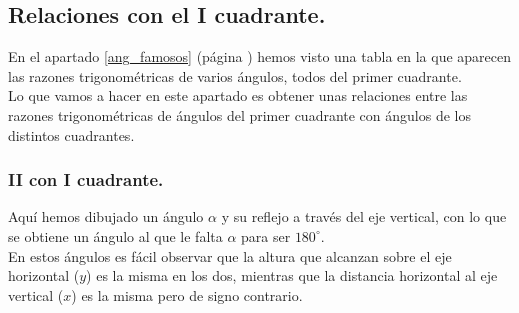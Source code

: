 \documentclass[a4paper,11pt,answers]{exam}
\newcommand{\degree}{^\circ}
\begin{document}
\subsection{Relaciones con el I cuadrante.}
En el apartado \ref{ang_famosos} (página \pageref{ang_famosos}) hemos visto una tabla en la que aparecen las razones trigonométricas de varios ángulos, todos del primer cuadrante.\\
Lo que vamos a hacer en este apartado es obtener unas relaciones entre las razones trigonométricas de ángulos del primer cuadrante con ángulos de los distintos cuadrantes.\\
\subsubsection{II con I cuadrante.} \label{cuadrante2}
Aquí hemos dibujado un ángulo $\alpha$ y su reflejo a través del eje vertical, con lo que se obtiene un ángulo al que le falta $\alpha$ para ser $180\degree$.\\
En estos ángulos es fácil observar que la altura que alcanzan sobre el eje horizontal ($y$) es la misma en los dos, mientras que la distancia horizontal al eje vertical ($x$) es la misma pero de signo contrario.\\
\end{document}
